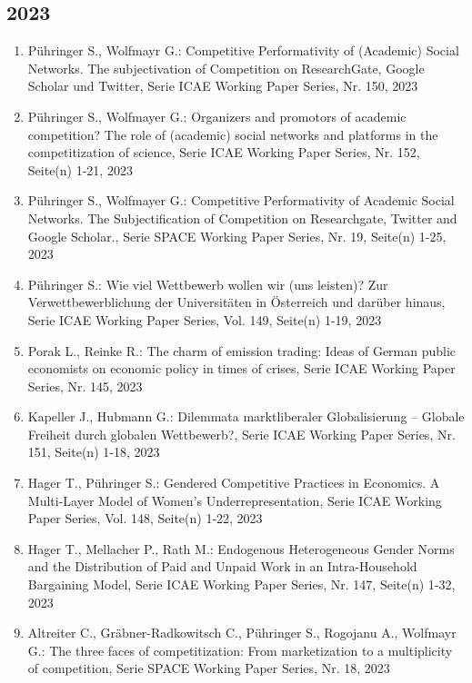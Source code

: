 \subsection*{2023}
\begin{enumerate}
    	 \item Pühringer S., Wolfmayr G.: Competitive Performativity of (Academic) Social Networks. The subjectivation of Competition on ResearchGate, Google Scholar und Twitter, Serie ICAE Working Paper Series, Nr. 150, 2023
	 \item Pühringer S., Wolfmayer G.: Organizers and promotors of academic competition? The role of (academic) social networks and platforms in the competitization of science, Serie ICAE Working Paper Series, Nr. 152, Seite(n) 1-21, 2023
	 \item Pühringer S., Wolfmayer G.: Competitive Performativity of Academic Social Networks. The Subjectification of Competition on Researchgate, Twitter and Google Scholar., Serie SPACE Working Paper Series, Nr. 19, Seite(n) 1-25, 2023
	 \item Pühringer S.: Wie viel Wettbewerb wollen wir (uns leisten)? Zur Verwettbewerblichung der Universitäten in Österreich und darüber hinaus, Serie ICAE Working Paper Series, Vol. 149, Seite(n) 1-19, 2023
	 \item Porak L., Reinke R.: The charm of emission trading: Ideas of German public economists on economic policy in times of crises, Serie ICAE Working Paper Series, Nr. 145, 2023
	 \item Kapeller J., Hubmann G.: Dilemmata marktliberaler Globalisierung – Globale Freiheit durch globalen Wettbewerb?, Serie ICAE Working Paper Series, Nr. 151, Seite(n) 1-18, 2023
	 \item Hager T., Pühringer S.: Gendered Competitive Practices in Economics. A Multi-Layer Model of Women’s Underrepresentation, Serie ICAE Working Paper Series, Vol. 148, Seite(n) 1-22, 2023
	 \item Hager T., Mellacher P., Rath M.: Endogenous Heterogeneous Gender Norms and the Distribution of Paid and Unpaid Work in an Intra-Household Bargaining Model, Serie ICAE Working Paper Series, Nr. 147, Seite(n) 1-32, 2023
	 \item Altreiter C., Gräbner-Radkowitsch C., Pühringer S., Rogojanu A., Wolfmayr G.: The three faces of competitization: From marketization to a multiplicity of competition, Serie SPACE Working Paper Series, Nr. 18, 2023
\end{enumerate}
